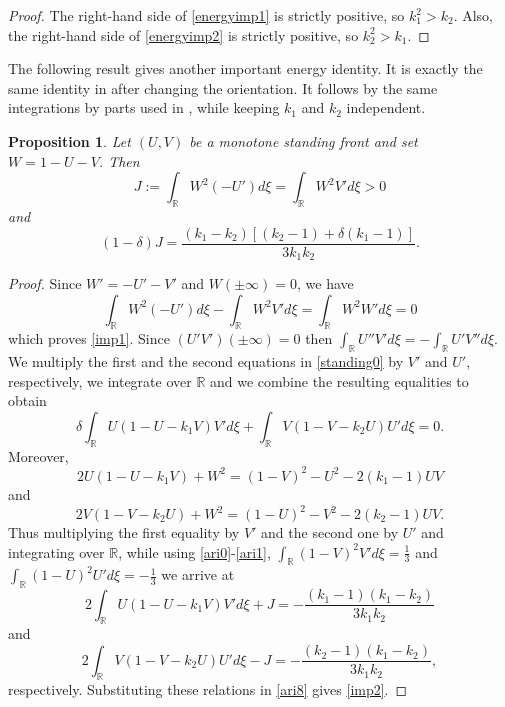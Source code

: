 \documentclass[11pt]{article}
\numberwithin{equation}{section}
\newcommand{\1}{\mathbbm{1}}
\numberwithin{equation}{section}
\newtheorem{proposition}[theorem]{Proposition}
\theoremstyle{definition}
\def \R {\mathbb{R}}
\numberwithin{equation}{section}
\begin{document}
\begin{proof}
	The right-hand side of \eqref{energyimp1} is strictly positive, so $k_1^2>k_2$. Also, the right-hand side of
	\eqref{energyimp2} is strictly positive, so $k_2^2>k_1$.
\end{proof}

The following result gives another important energy identity. It is exactly the same identity  in \cite[Theorem 1.1]{ma2026} after changing the orientation. It follows by the same integrations by parts used in \cite[Theorem 4.1]{kenne2026}, while keeping $k_1$ and $k_2$ independent.
\begin{proposition}\label{zerospeed}
	Let $(U,V)$ be a monotone standing front and set $W=1-U-V$. Then
	\begin{equation}\label{imp1}
	J:=\int_{\R} W^2(-U')d\xi=\int_{\R} W^2V'd\xi>0
	\end{equation}
	and 
		\begin{equation}\label{imp2}
	(1-\delta)J =\frac{(k_1-k_2)[(k_2-1)+\delta(k_1-1)]}{3k_1k_2}.
	\end{equation}
\end{proposition}

\begin{proof}
	Since $W'=-U'-V'$ and $W(\pm\infty)=0$, we have
\begin{equation*}
\int_{\R} W^2(-U')d\xi-\int_{\R} W^2V'd\xi=\int_{\R} W^2W'd\xi=0
\end{equation*}
which proves \eqref{imp1}. Since $(U'V')(\pm\infty) =0$ then
	$\int_{\R} U''V'd\xi=-\int_{\R} U'V''d\xi$. We multiply the first and the second equations in \eqref{standing0} by $V'$ and $U'$, respectively, we integrate over $\R$ and we combine the resulting equalities to obtain
	\begin{equation}\label{ari8}
		\delta\int_{\R} U(1-U-k_1V)V'd\xi+\int_{\R} V(1-V-k_2U)U'd\xi=0.
	\end{equation}
	Moreover,
	\begin{equation*}
		2U(1-U-k_1V)+W^2=(1-V)^2-U^2-2(k_1-1)UV
	\end{equation*}
	and 
\begin{equation*}
2V(1-V-k_2U)+W^2=(1-U)^2-V^2-2(k_2-1)UV.
\end{equation*}
Thus multiplying the first equality by $V'$ and the second one by $U'$ and integrating over $\R$, while using \eqref{ari0}-\eqref{ari1}, $\int_{\R}(1-V)^2V'd\xi=\frac{1}{3}$ and $\int_{\R}(1-U)^2U'd\xi=-\frac{1}{3}$ we arrive at
\begin{equation*}
2\int_{\R} U(1-U-k_1V)V'd\xi+J =-\frac{(k_1-1)(k_1-k_2)}{3k_1k_2}
\end{equation*}
and 
\begin{equation*}
2\int_{\R} V(1-V-k_2U)U'd\xi-J=-\frac{(k_2-1)(k_1-k_2)}{3k_1k_2},
\end{equation*}
respectively.	Substituting these relations  in \eqref{ari8} gives \eqref{imp2}.
\end{proof}
\end{document}
